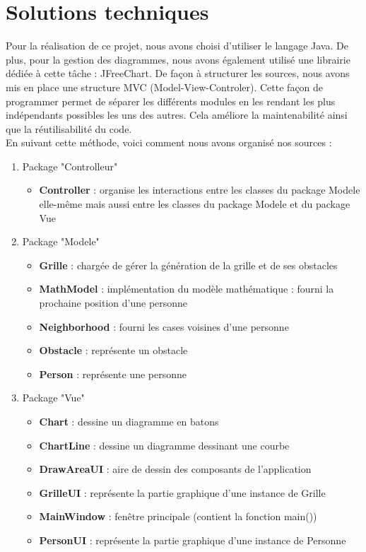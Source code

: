 \section{Solutions techniques}
	Pour la réalisation de ce projet, nous avons choisi d'utiliser le langage Java. De plus, pour la gestion des diagrammes, nous avons également utilisé une librairie dédiée à cette tâche : JFreeChart. De façon à structurer les sources, nous avons mis en place une structure MVC (Model-View-Controler). Cette façon de programmer permet de séparer les différents modules en les rendant les plus indépendants possibles les uns des autres. Cela améliore la maintenabilité ainsi que la réutilisabilité du code.\\
	En suivant cette méthode, voici comment nous avons organisé nos sources :
	
	\begin{enumerate}
		\item Package "Controlleur"
		\begin{itemize}
			\item \textbf{Controller} : organise les interactions entre les classes du package Modele elle-même mais aussi entre les classes du package Modele et du package Vue
		\end{itemize}
		
		\item Package "Modele"
		\begin{itemize}
			\item \textbf{Grille} : chargée de gérer la génération de la grille et de ses obstacles
			\item \textbf{MathModel} : implémentation du modèle mathématique : fourni la prochaine position d'une personne
			\item \textbf{Neighborhood} : fourni les cases voisines d'une personne
			\item \textbf{Obstacle} : représente un obstacle
			\item \textbf{Person} : représente une personne
		\end{itemize}
		
		\item Package "Vue"
		\begin{itemize}
			\item \textbf{Chart} : dessine un diagramme en batons
			\item \textbf{ChartLine} : dessine un diagramme dessinant une courbe
			\item \textbf{DrawAreaUI} : aire de dessin des composants de l'application
			\item \textbf{GrilleUI} : représente la partie graphique d'une instance de Grille 
			\item \textbf{MainWindow} : fenêtre principale (contient la fonction main())
			\item \textbf{PersonUI} : représente la partie graphique d'une instance de Personne
		\end{itemize}
	\end{enumerate}	
	
